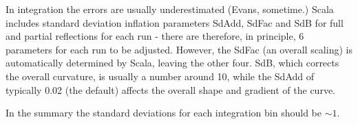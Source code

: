 \documentclass[a4paper, 11pt]{article}
\begin{document}
In integration the errors are usually underestimated (Evans, sometime.) 
Scala includes standard deviation inflation parameters SdAdd, SdFac and SdB
for full and partial reflections for each run - there are therefore, in 
principle, 6 parameters for each run to be adjusted. However, the SdFac
(an overall scaling) is automatically determined by Scala, leaving the 
other four. SdB, which corrects the overall curvature, is usually a number
around 10, while the SdAdd of typically 0.02 (the default) affects the 
overall shape and gradient of the curve.

In the summary the standard deviations for each integration bin should 
be $\sim 1$.
\end{document}
